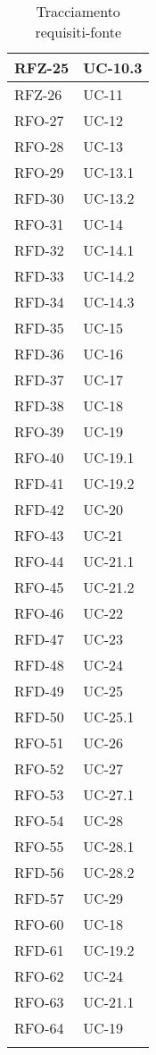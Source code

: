 \begin{xltabular}{\textwidth}{|X | X|}
    \hline
    RFZ-25 & UC-10.3 \\
    \hline
    RFZ-26 & UC-11 \\
    \hline
    RFO-27 & UC-12 \\
    \hline
    RFO-28 & UC-13 \\
    \hline
    RFO-29 & UC-13.1 \\
    \hline
    RFD-30 & UC-13.2 \\
    \hline
    RFO-31 & UC-14 \\
    \hline
    RFD-32 & UC-14.1 \\
    \hline
    RFD-33 & UC-14.2 \\
    \hline
    RFD-34 & UC-14.3 \\
    \hline
    RFD-35 & UC-15 \\
    \hline
    RFD-36 & UC-16 \\
    \hline
    RFD-37 & UC-17 \\
    \hline
    RFD-38 & UC-18 \\
    \hline
    RFO-39 & UC-19 \\
    \hline
    RFO-40 & UC-19.1 \\
    \hline
    RFD-41 & UC-19.2 \\
    \hline
    RFD-42 & UC-20 \\
    \hline
    RFO-43 & UC-21 \\
    \hline
    RFO-44 & UC-21.1 \\
    \hline
    RFO-45 & UC-21.2\\
    \hline
    RFO-46 & UC-22 \\
    \hline
    RFD-47 & UC-23 \\
    \hline
    RFD-48 & UC-24 \\
    \hline
    RFD-49 & UC-25 \\
    \hline
    RFD-50 & UC-25.1 \\
    \hline
    RFO-51 & UC-26 \\
    \hline
    RFO-52 & UC-27 \\
    \hline
    RFO-53 & UC-27.1 \\
    \hline
    RFO-54 & UC-28 \\
    \hline
    RFO-55 & UC-28.1 \\
    \hline
    RFD-56 & UC-28.2 \\
    \hline
    RFD-57 & UC-29 \\
    \hline
    RFO-60 & UC-18 \\
    \hline
    RFD-61 & UC-19.2 \\
    \hline
    RFO-62 & UC-24 \\
    \hline
    RFO-63 & UC-21.1 \\
    \hline
    RFO-64 & UC-19 \\
\hline
     \caption{Tracciamento requisiti-fonte}
    \label{tab:riepilogo}
\end{xltabular}

